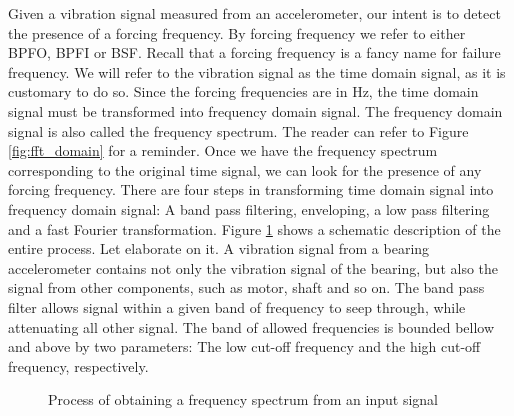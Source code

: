 \documentclass[../Main/thesis.tex]{subfiles}
\begin{document}
Given a vibration signal measured from an accelerometer, our intent is to detect the presence of a forcing frequency. By forcing frequency we refer to either BPFO, BPFI or BSF. Recall that a forcing frequency is a fancy name for failure frequency. We will refer to the vibration signal as the time domain signal, as it is customary to do so. Since the forcing frequencies are in Hz, the time domain signal must be transformed into frequency domain signal. The frequency domain signal is also called the frequency spectrum. The reader can refer to Figure \ref{fig:fft_domain} for a reminder. Once we have the frequency spectrum corresponding to the original time signal, we can look for the presence of any forcing frequency.
\justify
There are four steps in transforming time domain signal into frequency domain signal: A band pass filtering, enveloping, a low pass filtering and a fast Fourier transformation.
Figure \ref{fig:fft-process} shows a schematic description of the entire process. Let elaborate on it.  A vibration signal from a bearing accelerometer contains not only the vibration signal of the bearing, but also the signal from other components, such as motor, shaft and so on.
\justify
The band pass filter allows signal within a given band of frequency to seep through, while attenuating all other signal. The band of allowed frequencies is bounded bellow and above by two parameters: The low cut-off frequency and the high cut-off frequency, respectively.
\begin{figure}[H]
  \caption{Process of obtaining a frequency spectrum from an input signal}
   \label{fig:fft-process}
\end{figure}
\end{document}
